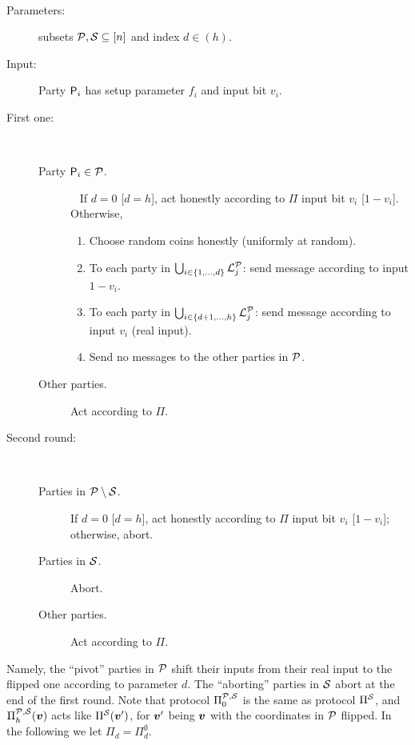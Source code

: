 { \samepage
\begin{protocol}[$\PP_d$]\label{prot:main:2} ~
\begin{description}
    \item [Parameters:] subsets  $\mathcal{P},\mathcal{S} \subseteq [n]$ and  index $d\in (h)$.
    \item [Input:] Party $\mathsf{P}_i$ has setup parameter $f_i$ and input bit $v_i$.

	\item [First one:] ~
	\begin{description}
		\item[Party  $\mathsf{P}_i \in \mathcal{P}$.] ~
		If $d=0$ [\resp $d=h$], act honestly according to  $\Pi$ \wrt input bit $v_i$ [\resp $1-v_i$].
		Otherwise,
		\begin{enumerate}
			\item Choose random  coins honestly (\ie uniformly at random).
			
			\item To each  party in $\bigcup_{i \in \left\{1,\ldots,d\right\}} {\cal{L}}_j^{\mathcal{P}}$:  send message according to input $ 1-v_i$.
			
			\item To each  party in $\bigcup_{i \in \left\{d+1 ,\ldots, h\right\}} {\cal{L}}_j^{\mathcal{P}}$: send  message according to input $v_i$ (real input).
			
			\item Send no messages to the other parties in $\mathcal{P}$.
		\end{enumerate}
		
		\item[Other parties.]   Act according to  $\Pi$.
	\end{description}
	
	\item [Second round:]~
	\begin{description}
		\item[Parties in $\mathcal{P} \setminus {\cal{S}}$.] If $d=0$ [\resp $d=h$], act honestly according to  $\Pi$ \wrt input bit $v_i$ [\resp $1-v_i$]; otherwise, abort.
		
		\item[Parties in $\mathcal{S}$.] Abort.
		

		
		\item[Other parties.]   Act according to  $\Pi$.
	\end{description}
\end{description}
\end{protocol}
}
Namely, the ``pivot'' parties in $\mathcal{P}$ shift their inputs from their real input to the flipped one  according to parameter $d$. The ``aborting'' parties in ${\cal{S}}$ abort at the end of the first round. Note that protocol $\Pi^{\mathcal{P},\mathcal{S}}_{0}$ is the same as protocol $\Pi^{\cal{S}}$, and $\Pi^{\mathcal{P},\mathcal{S}}_h({ \boldsymbol{v}})$ acts like  $\Pi^{\cal{S}}({ \boldsymbol{v}}')$, for ${ \boldsymbol{v}}'$ being ${ \boldsymbol{v}}$ with   the coordinates in $\mathcal{P}$ flipped. In the following we let $\Pi_d = \Pi^\emptyset_d$.


